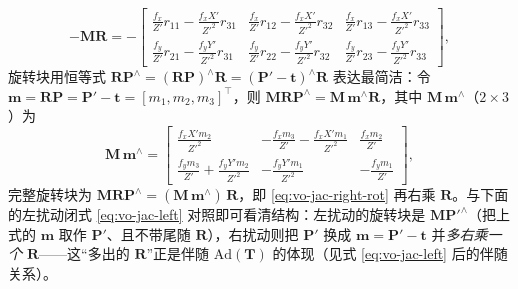 \begin{derivation}
\begin{equation}
  -\mathbf{M}\mathbf{R}=-\begin{bmatrix}
  \frac{f_x}{Z'}r_{11}-\frac{f_xX'}{Z'^2}r_{31} & \frac{f_x}{Z'}r_{12}-\frac{f_xX'}{Z'^2}r_{32} & \frac{f_x}{Z'}r_{13}-\frac{f_xX'}{Z'^2}r_{33}\\[4pt]
  \frac{f_y}{Z'}r_{21}-\frac{f_yY'}{Z'^2}r_{31} & \frac{f_y}{Z'}r_{22}-\frac{f_yY'}{Z'^2}r_{32} & \frac{f_y}{Z'}r_{23}-\frac{f_yY'}{Z'^2}r_{33}
  \end{bmatrix},
  \label{eq:vo-jac-right-trans}
\end{equation}
旋转块用恒等式 $\mathbf{R}\mathbf{P}^\wedge=(\mathbf{R}\mathbf{P})^\wedge\mathbf{R}=(\mathbf{P}'-\mathbf{t})^\wedge\mathbf{R}$ 表达最简洁：令 $\mathbf{m}=\mathbf{R}\mathbf{P}=\mathbf{P}'-\mathbf{t}=[m_1,m_2,m_3]^\top$，则 $\mathbf{M}\mathbf{R}\mathbf{P}^\wedge=\mathbf{M}\,\mathbf{m}^\wedge\mathbf{R}$，其中 $\mathbf{M}\,\mathbf{m}^\wedge$（$2\times3$）为
\begin{equation}
  \mathbf{M}\,\mathbf{m}^\wedge=\begin{bmatrix}
  \frac{f_xX'm_2}{Z'^2} & -\frac{f_x m_3}{Z'}-\frac{f_xX'm_1}{Z'^2} & \frac{f_x m_2}{Z'}\\[4pt]
  \frac{f_y m_3}{Z'}+\frac{f_yY'm_2}{Z'^2} & -\frac{f_yY'm_1}{Z'^2} & -\frac{f_y m_1}{Z'}
  \end{bmatrix},
  \label{eq:vo-jac-right-rot}
\end{equation}
完整旋转块为 $\mathbf{M}\mathbf{R}\mathbf{P}^\wedge=(\mathbf{M}\,\mathbf{m}^\wedge)\,\mathbf{R}$，即 \cref{eq:vo-jac-right-rot} 再右乘 $\mathbf{R}$。与下面的左扰动闭式 \cref{eq:vo-jac-left} 对照即可看清结构：左扰动的旋转块是 $\mathbf{M}\mathbf{P}'^\wedge$（把上式的 $\mathbf{m}$ 取作 $\mathbf{P}'$、且不带尾随 $\mathbf{R}$），右扰动则把 $\mathbf{P}'$ 换成 $\mathbf{m}=\mathbf{P}'-\mathbf{t}$ 并\emph{多右乘一个 $\mathbf{R}$}——这“多出的 $\mathbf{R}$”正是伴随 $\mathrm{Ad}(\mathbf{T})$ 的体现（见式 \cref{eq:vo-jac-left} 后的伴随关系）。


\end{derivation}
